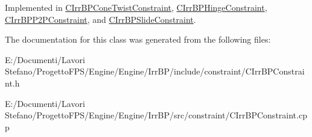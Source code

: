 Implemented in \hyperlink{class_c_irr_b_p_cone_twist_constraint_a11ae1560c750788403c260ba82f9b02e}{CIrrBPConeTwistConstraint}, \hyperlink{class_c_irr_b_p_hinge_constraint_a8c9ba8b2ee3bdff9ea684f2200c302ce}{CIrrBPHingeConstraint}, \hyperlink{class_c_irr_b_p_p2_p_constraint_abc3ec07fbc260cb8f88727fd8e9fc2c6}{CIrrBPP2PConstraint}, and \hyperlink{class_c_irr_b_p_slide_constraint_acaaf3cfaba14b8c126ab548f7c21c2b6}{CIrrBPSlideConstraint}.



The documentation for this class was generated from the following files:\begin{DoxyCompactItemize}
\item 
E:/Documenti/Lavori Stefano/ProgettoFPS/Engine/Engine/IrrBP/include/constraint/CIrrBPConstraint.h\item 
E:/Documenti/Lavori Stefano/ProgettoFPS/Engine/Engine/IrrBP/src/constraint/CIrrBPConstraint.cpp\end{DoxyCompactItemize}
